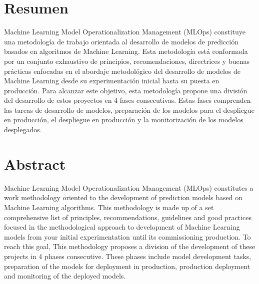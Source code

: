 \documentclass[twoside,twocolumn]{article}
\begin{document}
\section{Resumen}
Machine Learning Model Operationalization Management (MLOps) 
constituye una metodología de trabajo orientada al desarrollo 
de modelos de predicción basados en algoritmos de Machine Learning. 
Esta metodología está conformada por un conjunto exhaustivo de 
principios, recomendaciones, directrices y buenas prácticas 
enfocadas en el abordaje metodológico del desarrollo de modelos 
de Machine Learning desde su experimentación inicial hasta su 
puesta en producción. Para alcanzar este objetivo, esta 
metodología propone una división del desarrollo de estos 
proyectos en 4 fases consecutivas. Estas fases comprenden las 
tareas de desarrollo de modelos, preparación de los modelos para 
el despliegue en producción, el despliegue en producción y la 
monitorización de los modelos desplegados.

\section{Abstract}

Machine Learning Model Operationalization Management
(MLOps) constitutes a work methodology
oriented to the development of prediction models
based on Machine Learning algorithms.
This methodology is made up of a set
comprehensive list of principles, recommendations,
guidelines and good practices focused
in the methodological approach to development
of Machine Learning models from your
initial experimentation until its commissioning
production. To reach this goal,
This methodology proposes a division of the
development of these projects in 4 phases
consecutive. These phases include
model development tasks, preparation
of the models for deployment in production,
production deployment and monitoring
of the deployed models.





\end{document}

